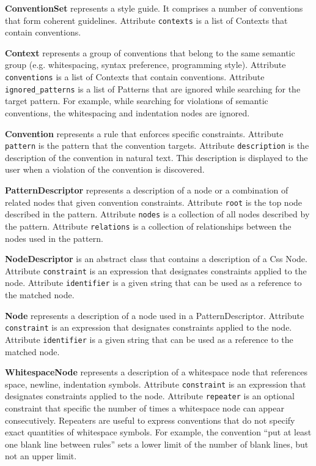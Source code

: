 \documentclass[parskip=full]{uvamscse}
\begin{document}
\begin{description}

\item\textbf{ConventionSet} represents a style guide. It comprises a number of conventions that form coherent guidelines. Attribute \texttt{contexts} is a list of Contexts that contain conventions.


\item\textbf{Context} represents a group of conventions that belong to the same semantic group (e.g. whitespacing, syntax preference, programming style). Attribute \texttt{conventions} is a list of Contexts that contain conventions. Attribute \texttt{ignored\_patterns} is a list of Patterns that are ignored while searching for the target pattern. For example, while searching for violations of semantic conventions, the whitespacing and indentation nodes are ignored.

\item\textbf{Convention} represents a rule that enforces specific constraints. Attribute \texttt{pattern} is the pattern that the convention targets. Attribute \texttt{description} is the description of the convention in natural text. This description is displayed to the user when a violation of the convention is discovered.

\item\textbf{PatternDescriptor} represents a description of a node or a combination of related nodes that given convention constraints. Attribute \texttt{root} is the top node described in the pattern. Attribute \texttt{nodes} is a collection of all nodes described by the pattern. Attribute \texttt{relations} is a collection of relationships between the nodes used in the pattern.

\item\textbf{NodeDescriptor} is an abstract class that contains a description of a Css Node. Attribute
\texttt{constraint} is an expression that designates constraints applied to the node.
Attribute \texttt{identifier} is a given string that can be used as a reference to the matched node.

\item\textbf{Node} represents a description of a node used in a PatternDescriptor. Attribute
\texttt{constraint} is an expression that designates constraints applied to the node.
Attribute \texttt{identifier} is a given string that can be used as a reference to the matched node.

\item\textbf{WhitespaceNode} represents a description of a whitespace node that references space,
newline, indentation symbols. Attribute \texttt{constraint} is an expression that designates
constraints applied to the node. Attribute \texttt{repeater} is an optional constraint that specific
the number of times a whitespace node can appear consecutively. Repeaters are useful to express
conventions that do not specify exact quantities of whitespace symbols. For example, the convention
``put at least one blank line between rules'' sets a lower limit of the number of blank lines, but
not an upper limit.


\end{description}
\end{document}
